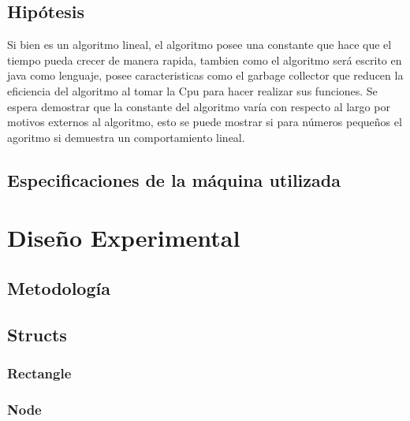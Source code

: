 \documentclass[letterpaper,10pt]{article}
\begin{document}
	\subsection{Hipótesis}
	
	Si bien es un algoritmo lineal, el algoritmo posee una constante que hace que el tiempo pueda crecer de manera rapida, tambien como el algoritmo será escrito en java como lenguaje, posee caracteristicas como el garbage collector que reducen la eficiencia del algoritmo al tomar la Cpu para hacer realizar sus funciones. Se espera demostrar que la constante del algoritmo varía con respecto al largo por motivos externos al algoritmo, esto se puede mostrar si para números pequeños el agoritmo si demuestra un comportamiento lineal.
	
	\subsection*{Especificaciones de la máquina utilizada}

	\newpage


	\section{Diseño Experimental}

	\subsection{Metodología}

	\subsection{Structs}

	\subsubsection{Rectangle}

	\subsubsection{Node}
\end{document}
